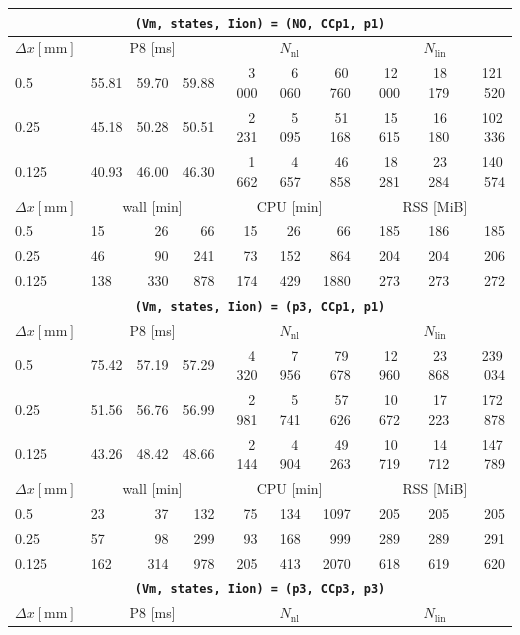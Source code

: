 \documentclass[11pt,a4paper]{article}
\newcommand{\code}[1]{\texttt{\small #1}}
\begin{document}
\begin{center}
\begin{longtable}{l|lrr|rrr|rrr}
\hline
\hline
\multicolumn{10}{c}{\textbf{\code{(Vm, states, Iion) = (NO, CCp1, p1)}}}\\\hline
$ \Delta x [\text{mm}] $ & \multicolumn{3}{c|}{P8 [ms]} & \multicolumn{3}{c|}{$N_{\mathrm{nl}}$} & \multicolumn{3}{c|}{$N_{\mathrm{lin}}$}\\
0.5 & 55.81 & 59.70 & 59.88 & 3\,000 & 6\,060 & 60\,760 & 12\,000 & 18\,179 & 121\,520\\
0.25 & 45.18 & 50.28 & 50.51 & 2\,231 & 5\,095 & 51\,168 & 15\,615 & 16\,180 & 102\,336\\
0.125 & 40.93 & 46.00 & 46.30 & 1\,662 & 4\,657 & 46\,858 & 18\,281 & 23\,284 & 140\,574\\
\hline
$ \Delta x [\text{mm}] $ & \multicolumn{3}{c|}{wall [min]} & \multicolumn{3}{c|}{CPU [min]} & \multicolumn{3}{c|}{RSS [MiB]}\\
0.5 & 15 & 26 & 66 & 15 & 26 & 66 & 185 & 186 & 185\\
0.25 & 46 & 90 & 241 & 73 & 152 & 864 & 204 & 204 & 206\\
0.125 & 138 & 330 & 878 & 174 & 429 & 1880 & 273 & 273 & 272\\
\hline
\hline
\multicolumn{10}{c}{\textbf{\code{(Vm, states, Iion) = (p3, CCp1, p1)}}}\\\hline
$ \Delta x [\text{mm}] $ & \multicolumn{3}{c|}{P8 [ms]} & \multicolumn{3}{c|}{$N_{\mathrm{nl}}$} & \multicolumn{3}{c|}{$N_{\mathrm{lin}}$}\\
0.5 & 75.42 & 57.19 & 57.29 & 4\,320 & 7\,956 & 79\,678 & 12\,960 & 23\,868 & 239\,034\\
0.25 & 51.56 & 56.76 & 56.99 & 2\,981 & 5\,741 & 57\,626 & 10\,672 & 17\,223 & 172\,878\\
0.125 & 43.26 & 48.42 & 48.66 & 2\,144 & 4\,904 & 49\,263 & 10\,719 & 14\,712 & 147\,789\\
\hline
$ \Delta x [\text{mm}] $ & \multicolumn{3}{c|}{wall [min]} & \multicolumn{3}{c|}{CPU [min]} & \multicolumn{3}{c|}{RSS [MiB]}\\
0.5 & 23 & 37 & 132 & 75 & 134 & 1097 & 205 & 205 & 205\\
0.25 & 57 & 98 & 299 & 93 & 168 & 999 & 289 & 289 & 291\\
0.125 & 162 & 314 & 978 & 205 & 413 & 2070 & 618 & 619 & 620\\
\hline
\hline
\multicolumn{10}{c}{\textbf{\code{(Vm, states, Iion) = (p3, CCp3, p3)}}}\\\hline
$ \Delta x [\text{mm}] $ & \multicolumn{3}{c|}{P8 [ms]} & \multicolumn{3}{c|}{$N_{\mathrm{nl}}$} & \multicolumn{3}{c|}{$N_{\mathrm{lin}}$}\\

\end{longtable}
\end{center}
\end{document}
